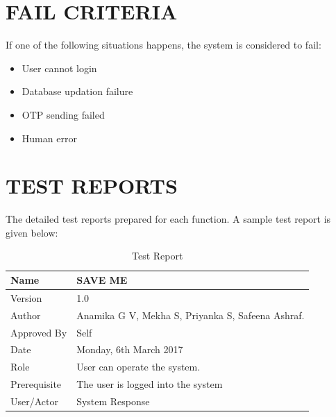 \documentclass[12pt,a4paper,oneside]{report}
\begin{document}
{\section{FAIL CRITERIA}
\par If one of the following situations happens, the system is considered to fail:
\begin{itemize}
\item	User cannot login
\item	Database updation failure
\item	OTP sending failed
\item	Human error
\end{itemize}
\section{TEST REPORTS}
The detailed test reports prepared for each function. A sample test report is given below:
\begin{table}[!htb]
\centering
\caption{Test Report}
\label{Test Report}
\begin{tabular}{|l|l|}
\hline
Name                                                                                & SAVE ME                                              \\ \hline
Version                                                                             & 1.0                                                                  \\ \hline
Author                                                                              & Anamika G V, Mekha S, Priyanka S, Safeena Ashraf.              \\ \hline
Approved By                                                                         & Self                                                                 \\ \hline
Date                                                                                & Monday, 6th March 2017                                            \\ \hline
Role                                                                                & User can operate the system.                                          \\ \hline
Prerequisite                                                                        & The user is logged into the system                                   \\ \hline
User/Actor                                                                          & System Response                                                      \\ \hline

\end{tabular}
\end{table}}
\end{document}
